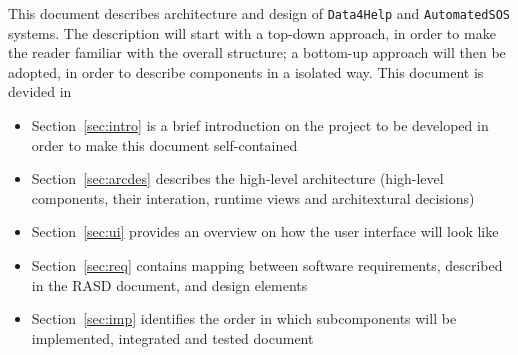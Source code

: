 \documentclass[../DD0.tex]{subfiles}
\begin{document}
  This document describes architecture and design of \texttt{Data4Help} and \texttt{AutomatedSOS} systems. The description will start with a top-down approach, in order to make the reader familiar with the overall structure; a bottom-up approach will then be adopted, in order to describe components in a isolated way. This document is devided in
  \begin{itemize}
    \item Section~\ref{sec:intro} is a brief introduction on the project to be developed in order to make this document self-contained

    \item Section~\ref{sec:arcdes} describes the high-level architecture (high-level components, their interation, runtime views and architextural decisions)

    \item Section~\ref{sec:ui} provides an overview on how the user interface will look like

    \item Section~\ref{sec:req} contains mapping between software requirements, described in the RASD document, and design elements
    
    \item Section~\ref{sec:imp} identifies the order in which subcomponents will be implemented, integrated and tested document
  \end{itemize}
\end{document}
